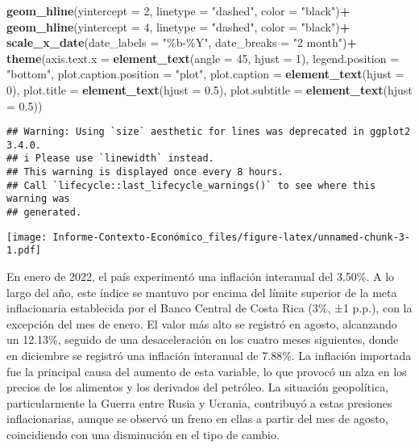 \documentclass[
]{article}
\newenvironment{Shaded}{\begin{snugshade}}{\end{snugshade}}
\newcommand{\AttributeTok}[1]{\textcolor[rgb]{0.13,0.29,0.53}{#1}}
\newcommand{\DecValTok}[1]{\textcolor[rgb]{0.00,0.00,0.81}{#1}}
\newcommand{\FloatTok}[1]{\textcolor[rgb]{0.00,0.00,0.81}{#1}}
\newcommand{\FunctionTok}[1]{\textcolor[rgb]{0.13,0.29,0.53}{\textbf{#1}}}
\newcommand{\NormalTok}[1]{#1}
\newcommand{\SpecialCharTok}[1]{\textcolor[rgb]{0.81,0.36,0.00}{\textbf{#1}}}
\newcommand{\StringTok}[1]{\textcolor[rgb]{0.31,0.60,0.02}{#1}}
\begin{document}
\begin{Shaded}
\begin{Highlighting}[]
  \FunctionTok{geom\_hline}\NormalTok{(}\AttributeTok{yintercept =} \DecValTok{2}\NormalTok{, }\AttributeTok{linetype =} \StringTok{"dashed"}\NormalTok{, }\AttributeTok{color =} \StringTok{"black"}\NormalTok{)}\SpecialCharTok{+}
  \FunctionTok{geom\_hline}\NormalTok{(}\AttributeTok{yintercept =} \DecValTok{4}\NormalTok{, }\AttributeTok{linetype =} \StringTok{"dashed"}\NormalTok{, }\AttributeTok{color =} \StringTok{"black"}\NormalTok{)}\SpecialCharTok{+}
  \FunctionTok{scale\_x\_date}\NormalTok{(}\AttributeTok{date\_labels =} \StringTok{"\%b{-}\%Y"}\NormalTok{, }\AttributeTok{date\_breaks =} \StringTok{"2 month"}\NormalTok{)}\SpecialCharTok{+}
  \FunctionTok{theme}\NormalTok{(}\AttributeTok{axis.text.x =} \FunctionTok{element\_text}\NormalTok{(}\AttributeTok{angle =} \DecValTok{45}\NormalTok{, }\AttributeTok{hjust =} \DecValTok{1}\NormalTok{),}
        \AttributeTok{legend.position =} \StringTok{"bottom"}\NormalTok{,}
        \AttributeTok{plot.caption.position =} \StringTok{"plot"}\NormalTok{,}
        \AttributeTok{plot.caption =} \FunctionTok{element\_text}\NormalTok{(}\AttributeTok{hjust =} \DecValTok{0}\NormalTok{),}
        \AttributeTok{plot.title =} \FunctionTok{element\_text}\NormalTok{(}\AttributeTok{hjust =} \FloatTok{0.5}\NormalTok{),}
        \AttributeTok{plot.subtitle =} \FunctionTok{element\_text}\NormalTok{(}\AttributeTok{hjust =} \FloatTok{0.5}\NormalTok{))}
\end{Highlighting}
\end{Shaded}

\begin{verbatim}
## Warning: Using `size` aesthetic for lines was deprecated in ggplot2 3.4.0.
## i Please use `linewidth` instead.
## This warning is displayed once every 8 hours.
## Call `lifecycle::last_lifecycle_warnings()` to see where this warning was
## generated.
\end{verbatim}

\texttt{[image: Informe-Contexto-Económico\_files/figure-latex/unnamed-chunk-3-1.pdf]}

En enero de 2022, el país experimentó una inflación interanual del
3.50\%. A lo largo del año, este índice se mantuvo por encima del límite
superior de la meta inflacionaria establecida por el Banco Central de
Costa Rica (3\%, ±1 p.p.), con la excepción del mes de enero. El valor
más alto se registró en agosto, alcanzando un 12.13\%, seguido de una
desaceleración en los cuatro meses siguientes, donde en diciembre se
registró una inflación interanual de 7.88\%. La inflación importada fue
la principal causa del aumento de esta variable, lo que provocó un alza
en los precios de los alimentos y los derivados del petróleo. La
situación geopolítica, particularmente la Guerra entre Rusia y Ucrania,
contribuyó a estas presiones inflacionarias, aunque se observó un freno
en ellas a partir del mes de agosto, coincidiendo con una disminución en
el tipo de cambio.
\end{document}
